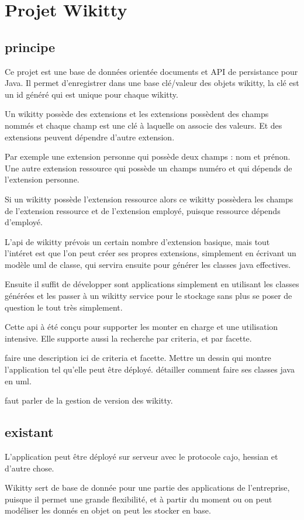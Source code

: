\section{Projet Wikitty}


\subsection{principe}

Ce projet est une base de données orientée documents et API de persistance pour
Java. Il permet d'enregistrer dans une base clé/valeur des objets wikitty, la
clé est un id généré qui est unique pour chaque wikitty.

Un wikitty possède des extensions et les extensions possèdent des champs nommés
et chaque champ est une clé à laquelle on associe des valeurs. Et des extensions
peuvent dépendre d'autre extension.

Par exemple une extension personne qui possède deux champs : nom et prénon.
Une autre extension ressource qui possède un champs numéro et qui dépends de
l'extension personne.

Si un wikitty possède l'extension ressource alors ce wikitty possèdera les
champs de l'extension ressource et de l'extension employé, puisque ressource
dépends d'employé.

L'api de wikitty prévois un certain nombre d'extension basique, mais tout
l'intéret est que l'on peut créer ses propres extensions, simplement en écrivant
un modèle uml de classe, qui servira ensuite pour générer les classes java
effectives.

Ensuite il suffit de développer sont applications simplement en utilisant les
classes générées et les passer à un wikitty service pour le stockage sans plus
se poser de question le tout très simplement.

Cette api à été conçu pour supporter les monter en charge et une utilisation
intensive. Elle supporte aussi la recherche par criteria, et par facette.

faire une description ici de criteria et facette.
Mettre un dessin qui montre l'application tel qu'elle peut être déployé.
détailler comment faire ses classes java en uml.


faut parler de la gestion de version des wikitty.


\subsection{existant}

L'application peut être déployé sur serveur avec le protocole cajo, hessian et
d'autre chose.

Wikitty sert de base de donnée pour une partie des applications de l'entreprise,
puisque il permet une grande flexibilité, et à partir du moment ou on peut
modéliser les donnés en objet on peut les stocker en base.


